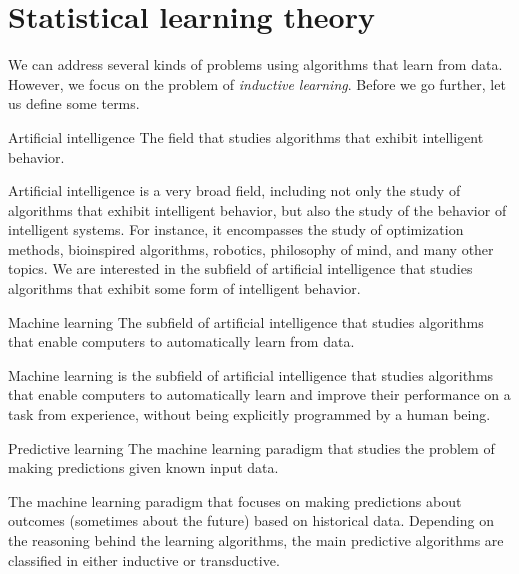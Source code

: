 \chapter{Statistical learning theory}


We can address several kinds of problems using algorithms that learn from data.  However,
we focus on the problem of \emph{inductive learning}. Before we go further, let us define some terms.

\begin{defbox}{Artificial intelligence}{}
  The field that studies algorithms that exhibit intelligent behavior.
\end{defbox}

Artificial intelligence is a very broad field, including not only the study of algorithms
that exhibit intelligent behavior, but also the study of the behavior of intelligent
systems.  For instance, it encompasses the study of optimization methods, bioinspired algorithms,
robotics, philosophy of mind, and many other topics.  We are interested in the subfield of
artificial intelligence that studies algorithms that exhibit some form of intelligent
behavior.

\begin{defbox}{Machine learning}{}
  The subfield of artificial intelligence that studies algorithms that enable computers to
  automatically learn from data.
\end{defbox}

Machine learning is the subfield of artificial intelligence that studies algorithms that
enable computers to automatically learn and improve their performance on a task from
experience, without being explicitly programmed by a human being.

\begin{defbox}{Predictive learning}{}
  The machine learning paradigm that studies the problem of making predictions given known
  input data.
\end{defbox}

The machine learning paradigm that focuses on making predictions about outcomes (sometimes
about the future) based on historical data. Depending on the reasoning behind the learning
algorithms, the main predictive algorithms are classified in either inductive or
transductive.

